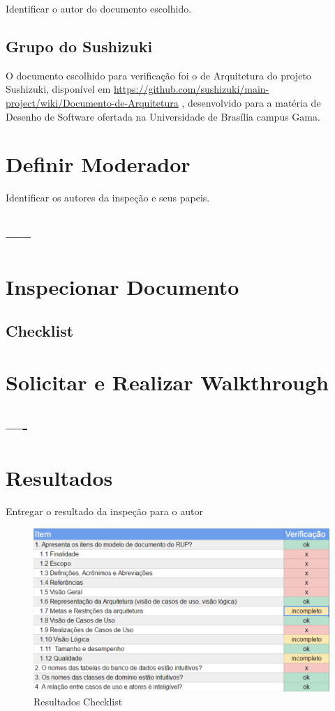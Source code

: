  Identificar o autor do documento escolhido. 

 \subsection{Grupo do Sushizuki}

 O documento escolhido para verificação foi o de Arquitetura do projeto Sushizuki, disponível em \url{https://github.com/sushizuki/main-project/wiki/Documento-de-Arquitetura} , desenvolvido para a matéria de Desenho de Software ofertada na Universidade de Brasília campus Gama.


 \section{Definir Moderador}

 Identificar os autores da inspeção e seus papeis. 

 \subsection{-----}

 \section{Inspecionar Documento}

 \subsection{Checklist}

 \section{Solicitar e Realizar Walkthrough}

 \subsection{----}

 \section{Resultados}

 Entregar o resultado da inspeção para o autor 

\begin{figure}[H]
  \center
  \includegraphics[width=1\textwidth]{figuras/checklist-results.png}
  \caption{Resultados Checklist}
  \label{fig:checklist-results}
\end{figure}

 \subsection{}
